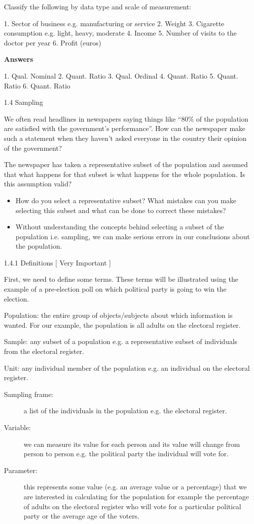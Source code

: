 \documentclass[12pt, a4paper]{report}
\theoremstyle{definition}
\theoremstyle{remark}
\begin{document}
Classify the following by data type and scale of measurement: 

1.	Sector of business e.g. manufacturing or service
2.	Weight
3.	Cigarette consumption e.g. light, heavy, moderate
4.	Income
5.	Number of visits to the doctor per year
6.	Profit (euros)



\textbf{Answers}


1.  Qual.      Nominal
2.  Quant.    Ratio
3.  Qual.      Ordinal
4.  Quant.    Ratio
5.  Quant.    Ratio
6.  Quant.	 Ratio


1.4   Sampling

We often read headlines in newspapers saying things like “80\% of the population are satisfied with the government’s performance”. How can the newspaper make such a statement when they haven’t asked everyone in the country their opinion of the government? 

The newspaper has taken a representative subset of the population and assumed that what happens for that subset is what happens for the whole population. Is this assumption valid? 



	\begin{itemize}
		\item 
How do you select a representative subset? What mistakes can you make selecting this subset and what can be done to correct these mistakes? 
\item Without understanding the concepts behind selecting a subset of the population i.e. sampling, we can make serious errors in our conclusions about the population.  
\end{itemize}

1.4.1 Definitions [ Very Important ]

First, we need to define some terms. These terms will be illustrated using the example of a pre-election poll on which political party is going to win the election.

Population: the entire group of objects/subjects about which information is wanted. For our example, the population is all adults on the electoral register.

Sample: any subset of a population e.g. a representative subset of individuals from the electoral register.

Unit: any individual member of the population e.g. an individual on the electoral register.

	\begin{description}
\item[Sampling frame:] a list of the individuals in the population e.g. the electoral register.

\item[Variable:] we can measure its value for each person and its value will change from person to person e.g. the political party the individual will vote for.

\item[Parameter:] this represents some value (e.g. an average value or a percentage) that we are interested in calculating for the population for example the percentage of adults on the electoral register who will vote for a particular political party or the average age of the voters. 
\end{description}
\end{document}
